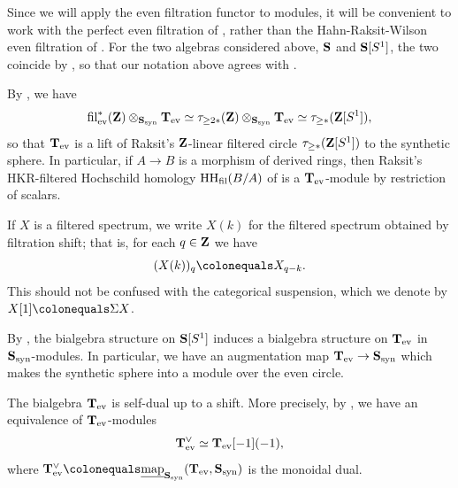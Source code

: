 \documentclass[oneside,a4paper]{amsart}
\begin{document}
\begin{remark}
Since we will apply the even filtration functor to modules, it will be convenient to work with the perfect even filtration of \cite{pstrkagowski2025perfect}, rather than the Hahn-Raksit-Wilson even filtration of \cite{hahnmotivic}. For the two algebras considered above, $\mathbf{S}$ and $\mathbf{S}[S^{1}]$, the two coincide by \cite[{Theorem 7.5}]{pstrkagowski2025perfect}, so that our notation above agrees with \cite{antieau2024cyclotomic}. 
\end{remark}

\begin{example}
\label{example:hrk_filtered_hochschild_homology_as_a_module_over_the_even_circle}
By \cite[{Corollary 2.44}]{antieau2024cyclotomic}, we have
\[
\operatorname{fil}_{\mathrm{ev}}^{\ast}(\mathbf{Z}) \otimes_{\mathbf{S}_{\mathrm{syn}}} \mathbf{T}_{\mathrm{ev}} \simeq  \tau_{\geq 2 \ast}(\mathbf{Z}) \otimes_{\mathbf{S}_{\mathrm{syn}}} \mathbf{T}_{\mathrm{ev}} \simeq \tau_{\geq \ast} (\mathbf{Z}[S^{1}]), 
\]
so that $\mathbf{T}_{\mathrm{ev}}$ is a lift of Raksit's $\mathbf{Z}$-linear filtered circle $\tau_{\geq \ast}(\mathbf{Z}[S^{1}])$ to the synthetic sphere. In particular, if $A \rightarrow B$ is a morphism of derived rings, then Raksit's $\mathrm{HKR}$-filtered Hochschild homology $\operatorname{HH}_{\operatorname{fil}}(B/A)$ of \cite[{Definition 6.2.1}]{raksit:2020} is a $\mathbf{T}_{\mathrm{ev}}$-module by restriction of scalars. 
\end{example}
\begin{notation}
If $X$ is a filtered spectrum, we write $X(k)$ for the filtered spectrum obtained by filtration shift; that is, for each $q \in \mathbf{Z}$ we have 
\[
(X(k))_{q} \colonequals X_{q-k}. 
\]
This should not be confused with the categorical suspension, which we denote by $X[1] \colonequals \Sigma X$. 
\end{notation}

\begin{recollection}
By \cite[{Corollary 2.44}]{antieau2024cyclotomic}, the bialgebra structure on $\mathbf{S}[S^{1}]$ induces a bialgebra structure on $\mathbf{T}_{\mathrm{ev}}$ in $\mathbf{S}_{\mathrm{syn}}$-modules. In particular, we have an augmentation map $\mathbf{T}_{\mathrm{ev}} \rightarrow \mathbf{S}_{\mathrm{syn}}$ which makes the synthetic sphere into a module over the even circle. 
\end{recollection}

\begin{recollection}
\label{recollection:dual_of_the_even_circle}
The bialgebra $\mathbf{T}_{\mathrm{ev}}$ is self-dual up to a shift. More precisely, by \cite[{Lemma 2.47}]{antieau2024cyclotomic}, we have an equivalence of $\mathbf{T}_{\mathrm{ev}}$-modules 
\[
\mathbf{T}_{\mathrm{ev}}^{\vee} \simeq \mathbf{T}_{\mathrm{ev}}[-1](-1),
\]
where $\evencircle^{\vee} \colonequals \underline{\map}_{\synsphere}(\evencircle, \synsphere)$ is the monoidal dual. 
\end{recollection}
\end{document}
